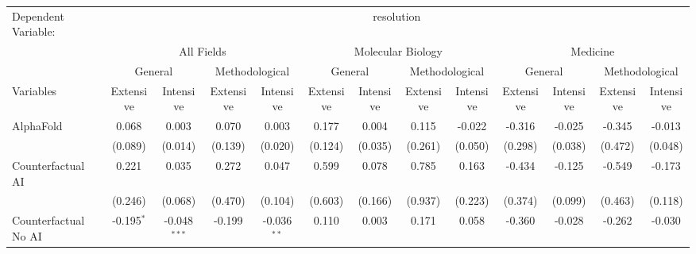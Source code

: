 \begingroup
\centering
\begin{tabular}{lcccccccccccc}
   \tabularnewline \midrule \midrule
   Dependent Variable: & \multicolumn{12}{c}{resolution}\\
 & \multicolumn{4}{c}{All Fields} & \multicolumn{4}{c}{Molecular Biology} & \multicolumn{4}{c}{Medicine} \\
\cmidrule(lr){2-5} \cmidrule(lr){6-9} \cmidrule(lr){10-13}
 & \multicolumn{2}{c}{General} & \multicolumn{2}{c}{Methodological} & \multicolumn{2}{c}{General} & \multicolumn{2}{c}{Methodological} & \multicolumn{2}{c}{General} & \multicolumn{2}{c}{Methodological} \\
\cmidrule(lr){2-3} \cmidrule(lr){4-5} \cmidrule(lr){6-7} \cmidrule(lr){8-9} \cmidrule(lr){10-11} \cmidrule(lr){12-13}
Variables & \multicolumn{1}{c}{Extensive} & \multicolumn{1}{c}{Intensive} & \multicolumn{1}{c}{Extensive} & \multicolumn{1}{c}{Intensive} & \multicolumn{1}{c}{Extensive} & \multicolumn{1}{c}{Intensive} & \multicolumn{1}{c}{Extensive} & \multicolumn{1}{c}{Intensive} & \multicolumn{1}{c}{Extensive} & \multicolumn{1}{c}{Intensive} & \multicolumn{1}{c}{Extensive} & \multicolumn{1}{c}{Intensive} \\
\cmidrule(lr){1-1}\cmidrule(lr){2-2} \cmidrule(lr){3-3} \cmidrule(lr){4-4} \cmidrule(lr){5-5} \cmidrule(lr){6-6} \cmidrule(lr){7-7} \cmidrule(lr){8-8} \cmidrule(lr){9-9} \cmidrule(lr){10-10} \cmidrule(lr){11-11} \cmidrule(lr){12-12} \cmidrule(lr){13-13}
   AlphaFold                                & 0.068        & 0.003          & 0.070   & 0.003         & 0.177   & 0.004   & 0.115   & -0.022  & -0.316  & -0.025  & -0.345  & -0.013\\   
                                            & (0.089)      & (0.014)        & (0.139) & (0.020)       & (0.124) & (0.035) & (0.261) & (0.050) & (0.298) & (0.038) & (0.472) & (0.048)\\   
   Counterfactual AI                        & 0.221        & 0.035          & 0.272   & 0.047         & 0.599   & 0.078   & 0.785   & 0.163   & -0.434  & -0.125  & -0.549  & -0.173\\   
                                            & (0.246)      & (0.068)        & (0.470) & (0.104)       & (0.603) & (0.166) & (0.937) & (0.223) & (0.374) & (0.099) & (0.463) & (0.118)\\   
   Counterfactual No AI                     & -0.195$^{*}$ & -0.048$^{***}$ & -0.199  & -0.036$^{**}$ & 0.110   & 0.003   & 0.171   & 0.058   & -0.360  & -0.028  & -0.262  & -0.030\\   

\end{tabular}
